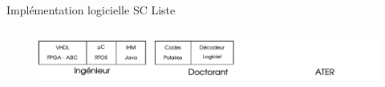 \documentclass[t,compress,mathserif,12pt,xcolor=dvipsnames]{beamer}
\begin{document}
\begin{frame}[t]{Implémentation logicielle SC Liste}
\begin{minipage}[t][5.0cm][t]{\textwidth}
\begin{columns}[T]
\begin{column}{0.04\textwidth}
      \end{column}
      \begin{column}{0.33\textwidth}
      \end{column}
    \end{columns}
  \end{minipage}
    \begin{figure}[htp]
    \centering
    \includegraphics[width=\textwidth]{fig/frise6}
  \end{figure}
\end{frame}
\end{document}
